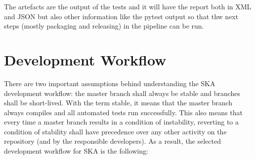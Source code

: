 \documentclass[a4paper,
               keeplastbox,   %
               ]{jacow}
\begin{document}
The artefacts are the output of the tests and it will have the report both in XML and JSON but also other information like the pytest output so that thw next steps (mostly packaging and releasing) in the pipeline can be run.

\section{Development Workflow}
There are two important assumptions behind understanding the SKA development workflow: the master branch shall always be stable and branches shall be short-lived. With the term stable, it means that the master branch always compiles and all automated tests run successfully. This also means that every time a master branch results in a condition of instability, reverting to a condition of stability shall have precedence over any other activity on the repository (and by the responsible developers).
As a result, the selected development workflow for SKA is the following:
\end{document}
